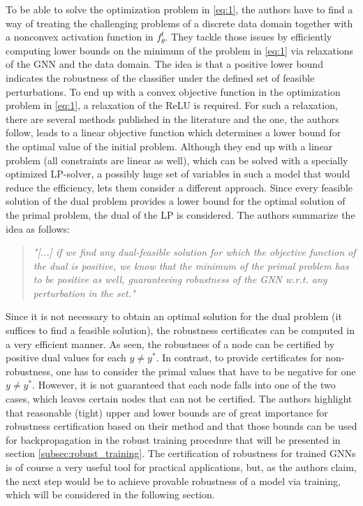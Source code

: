 \documentclass[a4paper,preprint]{sig-alternate}
\begin{document}
To be able to solve the optimization problem in \ref{eq:1}, the authors have to find a way of treating the challenging
problems of a discrete data domain together with a nonconvex activation function in $f_{\theta}^t$. \cite{Zuegner_2019}
They tackle those issues by efficiently computing lower bounds on the minimum of the problem in \ref{eq:1} via relaxations 
of the GNN and the data domain. The idea is that a positive lower bound indicates the robustness of the classifier under 
the defined set of feasible perturbations.
To end up with a convex objective function in the optimization problem in \ref{eq:1}, a relaxation of the ReLU is required. \cite{Zuegner_2019} 
For such a relaxation, there are several methods published in the literature and the one, the authors follow,
leads to a linear objective function which determines a lower bound for the optimal value of the initial problem.
Although they end up with a linear problem (all constraints are linear as well), which can be solved with a specially optimized LP-solver,
a possibly huge set of variables in such a model that would reduce the efficiency, lets them consider a different approach.
Since every feasible solution of the dual problem provides a lower bound for the optimal solution of the primal problem, 
the dual of the LP is considered. \cite{Zuegner_2019} The authors summarize the idea as follows:
\begin{quote}
    \emph{"[...] if we find any dual-feasible solution for which the objective function of the dual is positive, we know that the minimum of 
    the primal problem has to be positive as well, guaranteeing robustness of the GNN w.r.t. any perturbation in the set."} \cite{Zuegner_2019}
\end{quote}
Since it is not necessary to obtain an optimal solution for the dual problem (it suffices to find a feasible solution), the robustness certificates
can be computed in a very efficient manner. As seen, the robustness of a node can be certified by positive dual values for each $y \neq y^{\ast}$.
In contrast, to provide certificates for non-robustness, one has to consider the primal values that have to be negative for one $y \neq y^*$. \cite{Zuegner_2019}
However, it is not guaranteed that each node falls into one of the two cases, which leaves certain nodes that can not be certified.
The authors highlight that reasonable (tight) upper and lower bounds are of great importance for robustness certification based on their method
and that those bounds can be used for backpropagation in the robust training procedure that will be presented in section \ref{subsec:robust_training}.\newline
The certification of robustness for trained GNNs is of course a very useful tool for practical applications, 
but, as the authors claim, the next step would be to achieve provable robustness of a model via training,
which will be considered in the following section.
\end{document}
